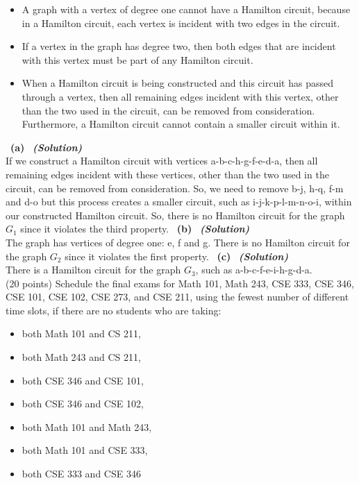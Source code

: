 \documentclass[a4 paper]{article}
\numberwithin{equation}{section}
\newcommand{\problem}[2]{~\\\fbox{\textbf{Problem #1}}\hfill (#2 points)\newline\newline}
\newcommand{\subproblem}[1]{~\newline\textbf{(#1)}}
\newcommand{\solution}{~\newline\textbf{\textit{(Solution)}} }
\newcommand{\0}{\mathbf{0}}
\begin{document}
\begin{itemize}
		\item A graph with a vertex of degree one cannot have a Hamilton circuit, because in a Hamilton circuit, each vertex is incident with two edges in the circuit.
		\item If a vertex in the graph has degree two, then
both edges that are incident with this vertex must be part of any Hamilton circuit.
		\item When a Hamilton circuit is being constructed and this circuit has passed through a vertex,
then all remaining edges incident with this vertex, other than the two used in the circuit, can be removed from consideration. Furthermore, a Hamilton circuit cannot contain a smaller circuit within it.
	\end{itemize}
\subproblem{a} \solution\\
If we construct a Hamilton circuit with vertices a-b-c-h-g-f-e-d-a, then all remaining edges incident with these vertices, other than the two used in the circuit, can be removed from consideration. So, we need to remove b-j, h-q, f-m and d-o but this process creates a smaller circuit, such as i-j-k-p-l-m-n-o-i, within our constructed Hamilton circuit. So, there is no Hamilton circuit for the graph $G_1$ since it violates the third property. 
\newline
\subproblem{b} \solution\\
The graph has vertices of degree one: e, f and g. There is no Hamilton circuit for the graph $G_2$ since it violates the first property.
\newline
\subproblem{c} \solution\\
There is a Hamilton circuit for the graph $G_3$, such as a-b-c-f-e-i-h-g-d-a.
\newpage
\problem{3: Applications on Graphs}{20}
Schedule the final exams for Math 101, Math 243, CSE 333, CSE 346, CSE 101, CSE 102, CSE 273, and CSE 211, using the fewest number of different time slots, if there are no students who are taking:
\begin{itemize}
	\item both Math 101 and CS 211,
	\item both Math 243 and CS 211,
	\item both CSE 346 and CSE 101,
	\item both CSE 346 and CSE 102,
	\item both Math 101 and Math 243,
	\item both Math 101 and CSE 333,
	\item both CSE 333 and CSE 346
\end{itemize}
\end{document}
